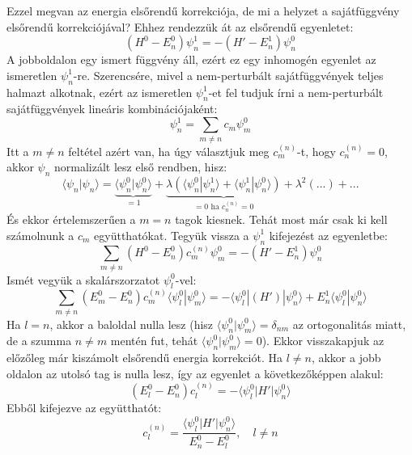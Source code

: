 \documentclass[../main.tex]{subfiles}
\begin{document}
Ezzel megvan az energia elsőrendű korrekciója, de mi a helyzet a sajátfüggvény elsőrendű korrekciójával? Ehhez rendezzük át az elsőrendű egyenletet:
\begin{equation}
    (H^0 - E_n^0) \psi_n^1 = - (H' - E_n^1) \psi_n^0
\end{equation}
A jobboldalon egy ismert függvény áll, ezért ez egy inhomogén egyenlet az ismeretlen $\psi_n^1$-re. Szerencsére, mivel a nem-perturbált sajátfüggvények teljes halmazt alkotnak, ezért az ismeretlen $\psi_n^1$-et fel tudjuk írni a nem-perturbált sajátfüggvények lineáris kombinációjaként:
\begin{equation}
    \psi_n^1 = \sum_{m \neq n} c_m \psi_m^0
\end{equation}
Itt a $m \neq n$ feltétel azért van, ha úgy választjuk meg $c_m^{(n)}$-t, hogy $c_n^{(n)} = 0$, akkor $\psi_n$ normalizált lesz első rendben, hisz:
\begin{equation}
   \langle \psi_n | \psi_n \rangle = \underbrace{\langle \psi_n^0 | \psi_n^0 \rangle}_{=1} + \underbrace{\lambda \left( \langle \psi_n^0 | \psi_n^1 \rangle + \langle \psi_n^1 | \psi_n^0 \rangle \right)}_{=0 \text{ ha } c_n^{(n)} = 0} + \lambda^2 (...) + ...
\end{equation}
És ekkor értelemszerűen a $m = n$ tagok kiesnek. Tehát most már csak ki kell számolnunk a $c_m$ együtthatókat. Tegyük vissza a $\psi_n^1$ kifejezést az egyenletbe:
\begin{equation}
     \sum_{m \neq n} (H^0 - E_n^0) c_m^{(n)} \psi_m^0 = - (H' - E_n^1) \psi_n^0
\end{equation}
Ismét vegyük a skalárszorzatot $\psi_l^{0}$-vel:
\begin{equation}
    \sum_{m \neq n} \left(E_m^0 - E_n^0\right) c_m^{(n)} \langle \psi_l^0 | \psi_m^0 \rangle = - \langle \psi_l^0 | (H') | \psi_n^0 \rangle + E_n^1 \langle \psi_l^0 | \psi_n^0 \rangle
\end{equation}
Ha $l = n$, akkor a baloldal nulla lesz (hisz  $\langle \psi_n^0 | \psi_m^0 \rangle = \delta_{nm}$ az ortogonalitás miatt, de a szumma $n \neq m$ mentén fut, tehát $\langle \psi_n^0 | \psi_m^0 \rangle = 0$). Ekkor visszakapjuk az előzőleg már kiszámolt elsőrendű energia korrekciót.
Ha $l \neq n$, akkor a jobb oldalon az utolsó tag is nulla lesz, így az egyenlet a következőképpen alakul:
\begin{equation}
    \left(E_l^0 - E_n^0\right) c_l^{(n)} = - \langle \psi_l^0 | H' | \psi_n^0 \rangle
\end{equation}
Ebből kifejezve az együtthatót:
\begin{equation}
    c_l^{(n)} = \frac{\langle \psi_l^0 | H' | \psi_n^0 \rangle}{E_n^0 - E_l^0}, \quad l \neq n
\end{equation}
\end{document}
